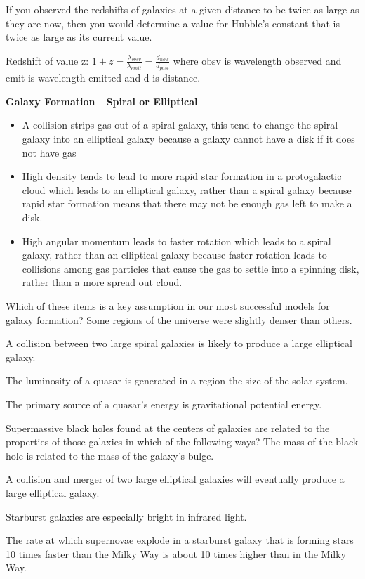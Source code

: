 If you observed the redshifts of galaxies at a given distance to be twice as large as they are now, then you would determine a value for Hubble's constant that is twice as large as its current value.

Redshift of value z: $1+z=\frac{\lambda_{obsv}}{\lambda_{emit}} = \frac{d_{now}}{d_{past}}$ where obsv is wavelength observed and emit is wavelength emitted and d is distance.

\textbf{Galaxy Formation—Spiral or Elliptical}
\begin{itemize}
\item A collision strips gas out of a spiral galaxy, this tend to change the spiral galaxy into an elliptical galaxy because a galaxy cannot have a disk if it does not have gas
\item High density tends to lead to more rapid star formation in a protogalactic cloud which leads to an elliptical galaxy, rather than a spiral galaxy because rapid star formation means that there may not be enough gas left to make a disk.
\item High angular momentum leads to faster rotation which leads to a spiral galaxy, rather than an elliptical galaxy because faster rotation leads to collisions among gas particles that cause the gas to settle into a spinning disk, rather than a more spread out cloud.
\end{itemize}

Which of these items is a key assumption in our most successful models for galaxy formation? Some regions of the universe were slightly denser than others.

A collision between two large spiral galaxies is likely to produce a large elliptical galaxy.

The luminosity of a quasar is generated in a region the size of the solar system.

The primary source of a quasar's energy is gravitational potential energy.

Supermassive black holes found at the centers of galaxies are related to the properties of those galaxies in which of the following ways? The mass of the black hole is related to the mass of the galaxy’s bulge.

A collision and merger of two large elliptical galaxies will eventually produce a large elliptical galaxy.

Starburst galaxies are especially bright in infrared light.

The rate at which supernovae explode in a starburst galaxy that is forming stars 10 times faster than the Milky Way is about 10 times higher than in the Milky Way.
